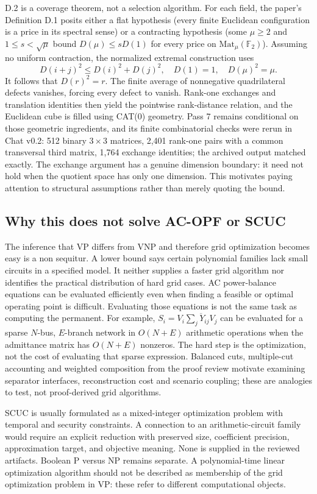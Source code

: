 \documentclass[11pt,letterpaper]{article}
\begin{document}
D.2 is a coverage theorem, not a selection algorithm. For each field, the paper's Definition D.1 posits either a flat hypothesis (every finite Euclidean configuration is a price in its spectral sense) or a contracting hypothesis (some $\mu\ge2$ and $1\le s<\sqrt\mu$ bound $D(\mu)\le sD(1)$ for every price on $\mathrm{Mat}_\mu(\mathbb F_2)$). Assuming no uniform contraction, the normalized extremal construction uses
\[
D(i+j)^2\le D(i)^2+D(j)^2,\quad D(1)=1,\quad D(\mu)^2=\mu.
\]
It follows that $D(r)^2=r$. The finite average of nonnegative quadrilateral defects vanishes, forcing every defect to vanish. Rank-one exchanges and translation identities then yield the pointwise rank-distance relation, and the Euclidean cube is filled using CAT(0) geometry. Pass 7 remains conditional on those geometric ingredients, and its finite combinatorial checks were rerun in Chat v0.2: 512 binary $3\times3$ matrices, 2,401 rank-one pairs with a common transversal third matrix, 1,764 exchange identities; the archived output matched exactly. The exchange argument has a genuine dimension boundary: it need not hold when the quotient space has only one dimension. This motivates paying attention to structural assumptions rather than merely quoting the bound.

\subsection{Why this does not solve AC-OPF or SCUC}
The inference that VP differs from VNP and therefore grid optimization becomes easy is a non sequitur. A lower bound says certain polynomial families lack small circuits in a specified model. It neither supplies a faster grid algorithm nor identifies the practical distribution of hard grid cases. AC power-balance equations can be evaluated efficiently even when finding a feasible or optimal operating point is difficult. Evaluating those equations is not the same task as computing the permanent. For example, $S_i=V_i\overline{\sum_jY_{ij}V_j}$ can be evaluated for a sparse $N$-bus, $E$-branch network in $O(N+E)$ arithmetic operations when the admittance matrix has $O(N+E)$ nonzeros. The hard step is the optimization, not the cost of evaluating that sparse expression. Balanced cuts, multiple-cut accounting and weighted composition from the proof review motivate examining separator interfaces, reconstruction cost and scenario coupling; these are analogies to test, not proof-derived grid algorithms.

SCUC is usually formulated as a mixed-integer optimization problem with temporal and security constraints. A connection to an arithmetic-circuit family would require an explicit reduction with preserved size, coefficient precision, approximation target, and objective meaning. None is supplied in the reviewed artifacts. Boolean P versus NP remains separate. A polynomial-time linear optimization algorithm should not be described as membership of the grid optimization problem in VP: these refer to different computational objects.
\end{document}
